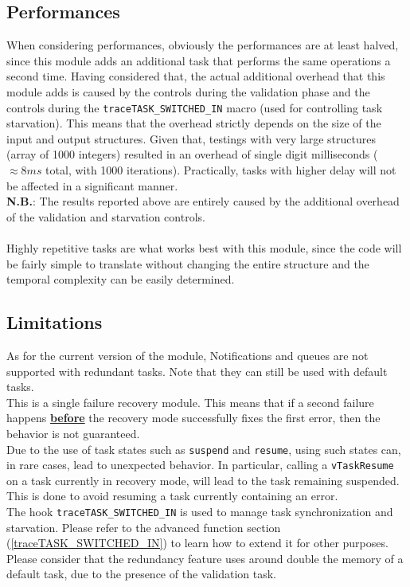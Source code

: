 \documentclass[a4paper, 12pt]{article}
\begin{document}
\begin{onehalfspace}
\subsection {Performances}\label{performances}
When considering performances, obviously the performances are at least halved, since this module adds an additional task that performs the same operations a second time. Having considered that, the actual additional overhead that this module adds is caused by the controls during the validation phase and the controls during the \texttt{traceTASK\_SWITCHED\_IN} macro (used for controlling task starvation). This means that the overhead strictly depends on the size of the input and output structures. Given that, testings with very large structures (array of 1000 integers) resulted in an overhead of single digit milliseconds ($\approx 8ms$ total, with 1000 iterations). Practically, tasks with higher delay will not be affected in a significant manner.\\
\textbf{N.B.}: The results reported above are entirely caused by the additional overhead of the validation and starvation controls.\\ \\
Highly repetitive tasks are what works best with this module, since the code will be fairly simple to translate without changing the entire structure and the temporal complexity can be easily determined.
\subsection{Limitations}\label{limitations}
As for the current version of the module, Notifications and queues are not supported with redundant tasks. Note that they can still be used with default tasks.\\
This is a single failure recovery module. This means that if a second failure happens \underline{\textbf{before}} the recovery mode successfully fixes the first error, then the behavior is not guaranteed. \\
Due to the use of task states such as \texttt{suspend} and \texttt{resume}, using such states can, in rare cases, lead to unexpected behavior. In particular, calling a \texttt{vTaskResume} on a task currently in recovery mode, will lead to the task remaining suspended. This is done to avoid resuming a task currently containing an error.\\
The hook \texttt{traceTASK\_SWITCHED\_IN} is used to manage task synchronization and starvation. Please refer to the advanced function section (\ref{traceTASK_SWITCHED_IN}) to learn how to extend it for other purposes.\\
Please consider that the redundancy feature uses around double the memory of a default task, due to the presence of the validation task. 

\end{onehalfspace}
\end{document}

